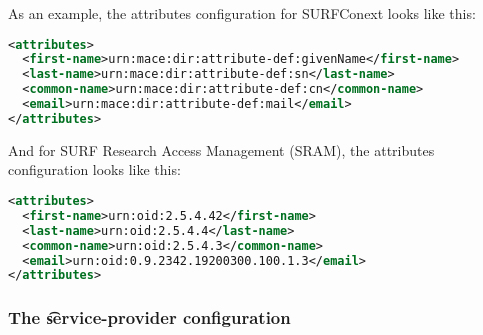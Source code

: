   As an example, the attributes configuration for SURFConext looks like this:

\begin{lstlisting}[language=xml]
<attributes>
  <first-name>urn:mace:dir:attribute-def:givenName</first-name>
  <last-name>urn:mace:dir:attribute-def:sn</last-name>
  <common-name>urn:mace:dir:attribute-def:cn</common-name>
  <email>urn:mace:dir:attribute-def:mail</email>
</attributes>
\end{lstlisting}

  And for SURF Research Access Management (SRAM), the attributes configuration
  looks like this:

\begin{lstlisting}[language=xml]
<attributes>
  <first-name>urn:oid:2.5.4.42</first-name>
  <last-name>urn:oid:2.5.4.4</last-name>
  <common-name>urn:oid:2.5.4.3</common-name>
  <email>urn:oid:0.9.2342.19200300.100.1.3</email>
</attributes>
\end{lstlisting}

\subsubsection{The \t{service-provider} configuration}

